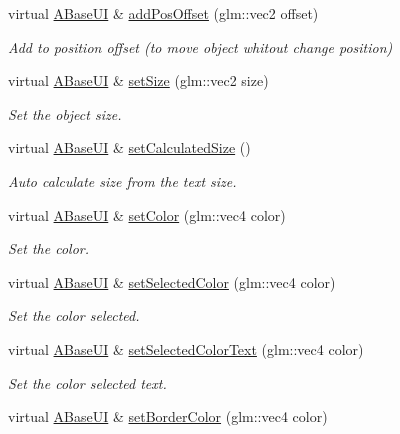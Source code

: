 \begin{DoxyCompactItemize}
virtual \hyperlink{class_a_base_u_i}{A\+Base\+UI} \& \hyperlink{class_a_base_u_i_abdf5aa14ea0b34192142fcbff0348fc0}{add\+Pos\+Offset} (glm\+::vec2 offset)
\begin{DoxyCompactList}\small\item\em Add to position offset (to move object whitout change position) \end{DoxyCompactList}\item 
virtual \hyperlink{class_a_base_u_i}{A\+Base\+UI} \& \hyperlink{class_a_base_u_i_ae50c31f566ad854411d09f75c2190c12}{set\+Size} (glm\+::vec2 size)
\begin{DoxyCompactList}\small\item\em Set the object size. \end{DoxyCompactList}\item 
virtual \hyperlink{class_a_base_u_i}{A\+Base\+UI} \& \hyperlink{class_a_base_u_i_aad292aed7bb28a2c8654ddfb54596a2c}{set\+Calculated\+Size} ()
\begin{DoxyCompactList}\small\item\em Auto calculate size from the text size. \end{DoxyCompactList}\item 
virtual \hyperlink{class_a_base_u_i}{A\+Base\+UI} \& \hyperlink{class_a_base_u_i_a13a7acc1e7ffa2c139c74e841d744753}{set\+Color} (glm\+::vec4 color)
\begin{DoxyCompactList}\small\item\em Set the color. \end{DoxyCompactList}\item 
virtual \hyperlink{class_a_base_u_i}{A\+Base\+UI} \& \hyperlink{class_a_base_u_i_a048cb78b3a5c32aa7ab844ffa445d7a5}{set\+Selected\+Color} (glm\+::vec4 color)
\begin{DoxyCompactList}\small\item\em Set the color selected. \end{DoxyCompactList}\item 
virtual \hyperlink{class_a_base_u_i}{A\+Base\+UI} \& \hyperlink{class_a_base_u_i_a5843ff5ba45830356043a6fefc24f798}{set\+Selected\+Color\+Text} (glm\+::vec4 color)
\begin{DoxyCompactList}\small\item\em Set the color selected text. \end{DoxyCompactList}\item 
virtual \hyperlink{class_a_base_u_i}{A\+Base\+UI} \& \hyperlink{class_a_base_u_i_a16d0d5da4f14b3e43a10f64cefbf8290}{set\+Border\+Color} (glm\+::vec4 color)

\end{DoxyCompactItemize}
